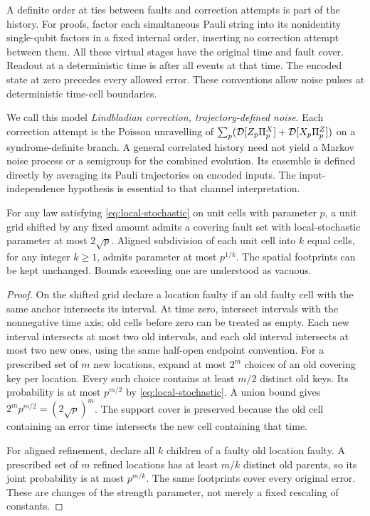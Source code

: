 A definite order at ties between faults and correction attempts is
part of the history. For proofs, factor each simultaneous Pauli
string into its nonidentity single-qubit factors in a fixed internal
order, inserting no correction attempt between them. All these
virtual stages have the original time and fault cover. Readout at
a deterministic time is after all events at that time. The encoded
state at zero precedes every allowed error. These conventions allow
noise pulses at deterministic time-cell boundaries.

We call this model \emph{Lindbladian correction, trajectory-defined
noise}. Each correction attempt is the Poisson unravelling of
\(\sum_p(\mathcal D[Z_p\Pi_p^X]+\mathcal D[X_p\Pi_p^Z])\) on a
syndrome-definite branch. A general correlated history need not
yield a Markov noise process or a semigroup for the combined
evolution. Its ensemble is defined directly by averaging its
Pauli trajectories on encoded inputs. The input-independence
hypothesis is essential to that channel interpretation.

\begin{lemma}\label{lem:grid}
For any law satisfying \eqref{eq:local-stochastic} on unit cells
with parameter \(p\), a unit grid shifted by any fixed amount
admits a covering fault set with local-stochastic parameter at
most \(2\sqrt p\). Aligned subdivision of each unit cell into
\(k\) equal cells, for any integer \(k\ge1\), admits parameter at
most \(p^{1/k}\). The spatial footprints can be kept unchanged.
Bounds exceeding one are understood as vacuous.
\end{lemma}
\begin{proof}
On the shifted grid declare a location faulty if an old faulty
cell with the same anchor intersects its interval. At time zero,
intersect intervals with the nonnegative time axis; old cells
before zero can be treated as empty. Each new interval intersects
at most two old intervals, and each old interval intersects at
most two new ones, using the same half-open endpoint convention.
For a prescribed set of \(m\) new locations, expand at most \(2^m\)
choices of an old covering key per location. Every such choice
contains at least \(m/2\) distinct old keys. Its probability is
at most \(p^{m/2}\) by \eqref{eq:local-stochastic}. A union bound
gives \(2^mp^{m/2}=(2\sqrt p)^m\).
The support cover is preserved because the old cell containing an
error time intersects the new cell containing that time.

For aligned refinement, declare all \(k\) children of a faulty
old location faulty. A prescribed set of \(m\) refined locations
has at least \(m/k\) distinct old parents, so its joint probability
is at most \(p^{m/k}\). The same footprints cover every original
error. These are changes of the strength parameter, not merely
a fixed rescaling of constants.
\end{proof}

